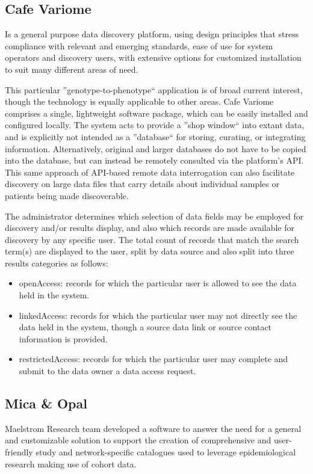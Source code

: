 \subsection*{Cafe Variome}
Is a general purpose data discovery platform, using design principles that stress
compliance with relevant and emerging standards, ease of use for system operators and
discovery users, with extensive options for customized installation to suit many
different areas of need.

This particular ''genotype-to-phenotype`` application is of broad current interest,
though the technology is equally applicable to other areas.
Cafe Variome~\cite{cafevariome} comprises a single, lightweight software package, which can be easily
installed and configured locally.
The system acts to provide a ''shop window`` into extant data, and is explicitly not
intended as a ''database`` for storing, curating, or integrating information.
Alternatively, original and larger databases do not have to be copied into the
database, but can instead be remotely consulted via the platform’s API.
This same approach of API-based remote data interrogation can also facilitate discovery
on large data files that carry details about individual samples or patients being made
discoverable.

The administrator determines which selection of data fields may be employed for
discovery and/or results display, and also which records are made available for
discovery by any specific user.
The total count of records that match the search term(s) are displayed to the user,
split by data source and also split into three results categories as follows:
\begin{itemize}
    \item openAccess: records for which the particular user is allowed to see the data
        held in the system.
    \item linkedAccess: records for which the particular user may not directly see the
        data held in the system, though a source data link or source contact
        information is provided.
    \item restrictedAccess: records for which the particular user may complete and
        submit to the data owner a data access request.
\end{itemize}

\subsection*{Mica \& Opal}
Maelstrom Research team developed a software to answer the need for a general and customizable solution to support the creation of comprehensive and user-friendly study and network-specific catalogues used to leverage epidemiological research making use of cohort data.

